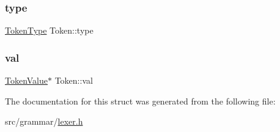 \subsubsection{\texorpdfstring{type}{type}}
{\footnotesize\ttfamily \hyperlink{lexer_8h_aa520fbf142ba1e7e659590c07da31921}{Token\+Type} Token\+::type}

\hypertarget{structToken_a1ac3c78f03efcbb1e5cae60d54ae3192}{}\label{structToken_a1ac3c78f03efcbb1e5cae60d54ae3192} 
\subsubsection{\texorpdfstring{val}{val}}
{\footnotesize\ttfamily \hyperlink{unionTokenValue}{Token\+Value}$\ast$ Token\+::val}



The documentation for this struct was generated from the following file\+:\begin{DoxyCompactItemize}
\item 
src/grammar/\hyperlink{lexer_8h}{lexer.\+h}\end{DoxyCompactItemize}
